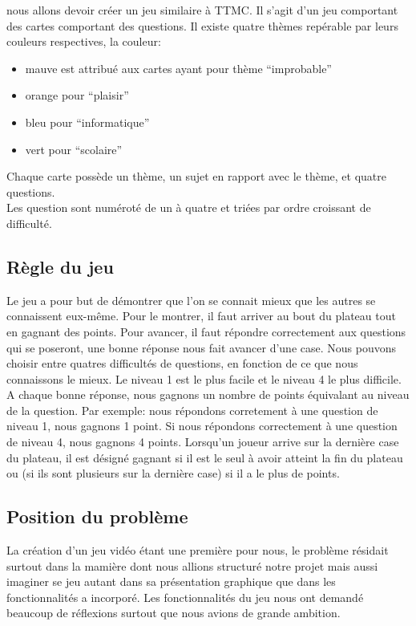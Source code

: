 nous allons devoir créer un jeu similaire à TTMC.
Il s'agit d'un jeu comportant des cartes comportant des questions. Il existe quatre thèmes repérable par leurs couleurs respectives, la couleur:
\begin{itemize}
	\item mauve est attribué aux cartes ayant pour thème ``improbable''
	\item orange pour ``plaisir''
	\item bleu pour ``informatique''
	\item vert pour ``scolaire''
\end{itemize}
Chaque carte possède un thème, un sujet en rapport avec le thème, et quatre questions.\\
Les question sont numéroté de un à quatre et triées par ordre croissant de difficulté.
\subsection{Règle du jeu}
Le jeu a pour but de démontrer que l'on se connait mieux que les autres se connaissent eux-même.
Pour le montrer, il faut arriver au bout du plateau tout en gagnant des points.
Pour avancer, il faut répondre correctement aux questions qui se poseront, une bonne réponse nous fait avancer d'une case.
Nous pouvons choisir entre quatres difficultés de questions, en fonction de ce que nous connaissons le mieux. Le niveau 1 est le plus facile et le niveau 4 le plus difficile.
A chaque bonne réponse, nous gagnons un nombre de points équivalant au niveau de la question. Par exemple: nous répondons corretement à une question de niveau 1, nous gagnons 1 point. Si nous répondons correctement à une question de niveau 4, 
nous gagnons 4 points. Lorsqu'un joueur arrive sur la dernière case du plateau, il est désigné gagnant si il est le seul à avoir atteint la fin du plateau ou (si ils sont plusieurs sur la dernière case) si il a le plus de points. 

\subsection{Position du problème}
La création d'un jeu vidéo étant une première pour nous, le problème résidait surtout dans la mamière dont nous allions structuré notre projet mais aussi imaginer se jeu autant dans sa présentation graphique que dans les fonctionnalités a 
incorporé. Les fonctionnalités du jeu nous ont demandé beaucoup de réflexions surtout que nous avions de grande ambition.